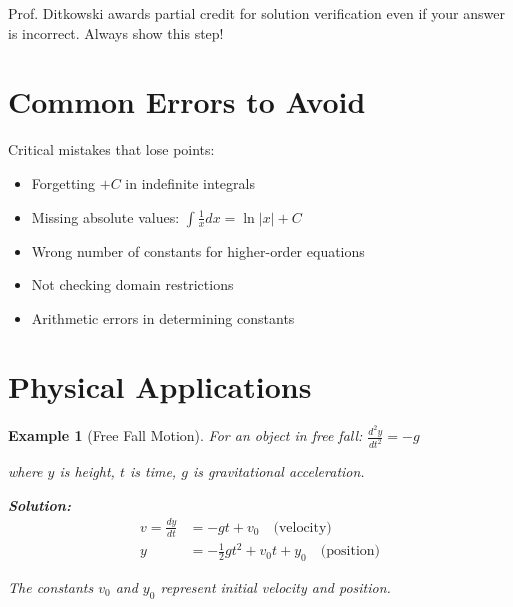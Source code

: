\documentclass[12pt]{article}
\newtheorem{example}{Example}
\begin{document}
\begin{examtip}
Prof. Ditkowski awards partial credit for solution verification even if your answer is incorrect. Always show this step!
\end{examtip}

\section{Common Errors to Avoid}

\begin{warning}
Critical mistakes that lose points:
\begin{itemize}
    \item Forgetting $+C$ in indefinite integrals
    \item Missing absolute values: $\int \frac{1}{x}dx = \ln|x| + C$
    \item Wrong number of constants for higher-order equations
    \item Not checking domain restrictions
    \item Arithmetic errors in determining constants
\end{itemize}
\end{warning}

\section{Physical Applications}

\begin{example}[Free Fall Motion]
For an object in free fall: $\frac{d^2 y}{dt^2} = -g$

where $y$ is height, $t$ is time, $g$ is gravitational acceleration.

\textbf{Solution:}
\begin{align}
v = \frac{dy}{dt} &= -gt + v_0 \quad \text{(velocity)}\\
y &= -\frac{1}{2}gt^2 + v_0 t + y_0 \quad \text{(position)}
\end{align}

The constants $v_0$ and $y_0$ represent initial velocity and position.
\end{example}
\end{document}
